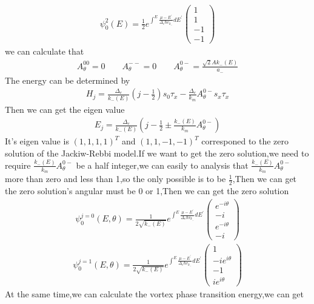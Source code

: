 \documentclass[4pt]{article}
\begin{document}
\begin{align}
	\psi_0^{2}(E)=\frac{1}{2}e^{\int^{E}\frac{\mu-E^{'}}{\Delta_e\hbar v_{k_{-}}}dE^{'}}
	\begin{pmatrix}
		1\\
		1\\
		-1\\
		-1
	\end{pmatrix}
\end{align}
we can calculate that 
\begin{align}
	A_{\theta}^{00}=0 \qquad A_{\theta}^{--}=0 \qquad A_{\theta}^{0-}=\frac{\sqrt{2}Ak_{-}(E)}{a_{-}}
\end{align}
The energy can be determined by 
\begin{align}
	H_j=\frac{\Delta_e}{k_{-}(E)}(j-\frac{1}{2})s_0\tau_x-\frac{\Delta_e}{k_m}A_{\theta}^{0-}s_x\tau_x
\end{align}
Then we can get the eigen value
\begin{align}
E_j=\frac{\Delta_e}{k_{-}(E)}(j-\frac{1}{2}\pm \frac{k_{-}(E)}{k_m}A_{\theta}^{0-})
\end{align}
It's eigen value is $(1,1,1,1)^T$ and $(1,1,-1,-1)^T$
corresponed to the zero solution of the Jackiw-Rebbi model.If we want to get the zero solution,we need to require $\frac{k_{-}(E)}{k_m}A_{\theta}^{0-}$ be a half integer,we can easily to analysis that $\frac{k_{-}(E)}{k_m}A_{\theta}^{0-}$ more than zero and less than 1,so the only possible is to be $\frac{1}{2}$,Then we can get the zero solution's angular must be 0 or 1,Then we can get the zero solution 
\begin{align}
	\psi_0^{j=0}(E,\theta)=\frac{1}{2\sqrt{k_{-}(E)}}e^{\int^E\frac{\mu-E^{'}}{\Delta_e\hbar v_{k_{-}}}dE^{'}}
	\begin{pmatrix}
		e^{-i\theta}\\
		-i\\
		e^{-i\theta}\\
		-i
	\end{pmatrix}
\end{align}
\begin{align}
	\psi_0^{j=1}(E,\theta)=\frac{1}{2\sqrt{k_{-}(E)}}e^{\int^E\frac{\mu-E^{'}}{\Delta_e\hbar v_{k_{-}}}dE^{'}}
	\begin{pmatrix}
		1\\
		-ie^{i\theta}\\
		-1\\
		ie^{i\theta}
	\end{pmatrix}
\end{align}
At the same time,we can calculate the vortex phase transition energy,we can get 
\end{document}
